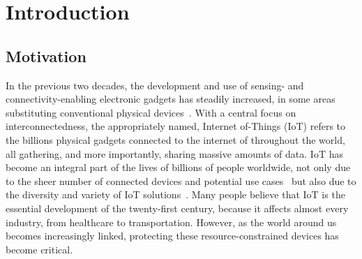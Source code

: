 \chapter{Introduction}

\section{Motivation}

In the previous two decades, the development and use of sensing- and connectivity-enabling electronic gadgets has steadily increased, in some areas substituting conventional physical devices~\cite{schiller}. With a central focus on interconnectedness, the appropriately named, Internet of-Things (IoT) refers to the billions physical gadgets connected to the internet of throughout the world, all gathering, and more importantly, sharing massive amounts of data. IoT has become an integral part of the lives of billions of people worldwide, not only due to the sheer number of connected devices and potential use cases~\cite{iot-size} but also due to the diversity and variety of IoT solutions~\cite{banafa2016iot}. Many people believe that IoT is the essential development of the twenty-first century, because it affects almost every industry, from healthcare to transportation. However, as the world around us becomes increasingly linked, protecting these resource-constrained devices has become critical.

